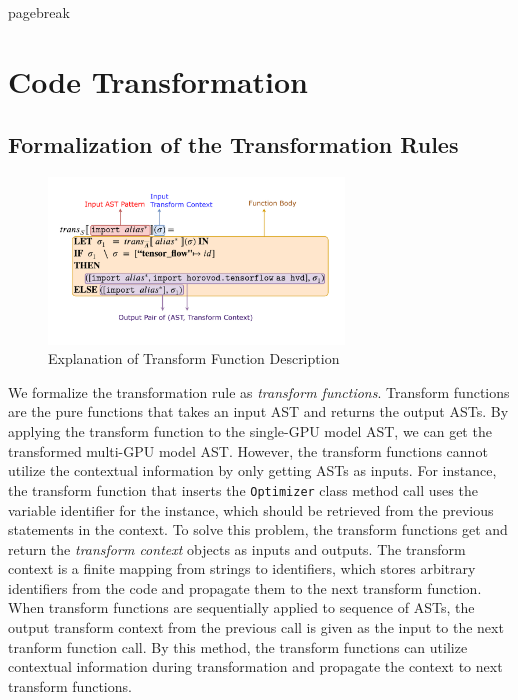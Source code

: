 pagebreak
\section{Code Transformation}\label{sec:trans}

\subsection{Formalization of the Transformation Rules}

\begin{figure}[ht!]
    \centering
    \includegraphics[width=0.7\textwidth]{transfn_expl.pdf}
    \caption{Explanation of Transform Function Description}
    \label{fig:trans:fnexpl}
\end{figure}

We formalize the transformation rule as \textit{transform functions}.
Transform functions are the pure functions that takes an input AST and
returns the output ASTs.
By applying the transform function to the single-GPU model AST,
we can get the transformed multi-GPU model AST.
However, the transform functions cannot utilize the contextual information
by only getting ASTs as inputs.
For instance, the transform function that inserts the {\tt Optimizer} class 
method call uses the variable identifier for the instance,
which should be retrieved from the previous statements in the context.
To solve this problem, the transform functions get and return
the \textit{transform context} objects as inputs and outputs.
The transform context is a finite mapping from strings to identifiers, which
stores arbitrary identifiers from the code and propagate them to the 
next transform function.
When transform functions are sequentially applied to sequence of ASTs, 
the output transform context from the previous call is given as the input
to the next tranform function call.
By this method, the transform functions can utilize contextual information
during transformation and propagate the context to next transform functions.


